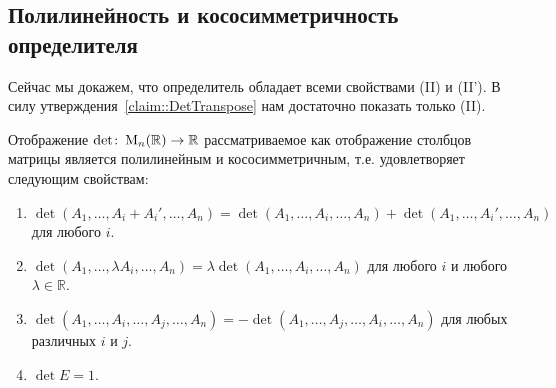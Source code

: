 \subsection{Полилинейность и кососимметричность определителя}

Сейчас мы докажем, что определитель обладает всеми свойствами (II) и (II').
В силу утверждения~\ref{claim::DetTranspose} нам достаточно показать только (II).

\begin{claim}
\label{claim::DetPolyAnti}
Отображение $\det\colon \operatorname{M}_{n}(\mathbb R)\to \mathbb R$ рассматриваемое как отображение столбцов матрицы является полилинейным и кососимметричным, т.е. удовлетворяет следующим свойствам:
\begin{enumerate}
\item $\det(A_1,\ldots, A_i + A_i', \ldots, A_n) = \det(A_1,\ldots, A_i, \ldots, A_n) + \det(A_1,\ldots,A_i', \ldots, A_n)$ для любого $i$.

\item $\det(A_1,\ldots, \lambda A_i, \ldots, A_n) = \lambda \det(A_1,\ldots, A_i, \ldots, A_n)$ для любого $i$ и любого $\lambda\in\mathbb R$.

\item $\det(A_1,\ldots, A_i, \ldots, A_j, \ldots, A_n) = -\det(A_1,\ldots, A_j, \ldots, A_i, \ldots, A_n)$ для любых различных $i$ и $j$.

\item $\det E = 1$.
\end{enumerate}
\end{claim}
